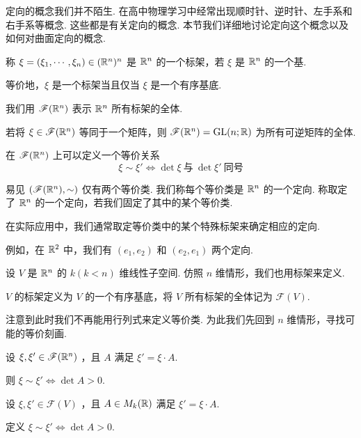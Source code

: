 定向的概念我们并不陌生. 在高中物理学习中经常出现顺时针、逆时针、左手系和右手系等概念. 这些都是有关定向的概念. 本节我们详细地讨论定向这个概念以及如何对曲面定向的概念.


\begin{definition}
称 $\xi=(\xi_1,\cdots,\xi_n)\in(\mathbb{R}^n)^n$ 是 $\mathbb{R}^n$ 的一个标架，若 $\xi$ 是 $\mathbb{R}^n$ 的一个基.
\end{definition}

等价地，$\xi$ 是一个标架当且仅当 $\xi$ 是一个有序基底.

我们用 $\mathscr{F}(\mathbb{R}^n)$ 表示 $\mathbb{R}^n$ 所有标架的全体.

\begin{hint}
若将 $\xi\in\mathscr{F}(\mathbb{R}^n)$ 等同于一个矩阵，则 $\mathscr{F}(\mathbb{R}^n)=\mathrm{GL}(n;\mathbb{R})$ 为所有可逆矩阵的全体.
\end{hint}

在 $\mathscr{F}(\mathbb{R}^n)$ 上可以定义一个等价关系
$$
\xi\sim\xi'\iff\det\xi~\text{与}~\det\xi'~\text{同号}
$$

易见 $(\mathscr{F}(\mathbb{R}^n),\sim)$ 仅有两个等价类. 我们称每个等价类是 $\mathbb{R}^n$ 的一个定向. 称取定了 $\mathbb{R}^n$ 的一个定向，若我们固定了其中的某个等价类.

\begin{hint}
在实际应用中，我们通常取定等价类中的某个特殊标架来确定相应的定向.

例如，在 $\mathbb{R}^2$ 中，我们有 $(e_1,e_2)$ 和 $(e_2,e_1)$ 两个定向.
\end{hint}

设 $V$ 是 $\mathbb{R}^n$ 的 $k(k<n)$ 维线性子空间. 仿照 $n$ 维情形，我们也用标架来定义.

\begin{definition}
$V$ 的标架定义为 $V$ 的一个有序基底，将 $V$ 所有标架的全体记为 $\mathscr{F}(V)$.
\end{definition}

注意到此时我们不再能用行列式来定义等价类. 为此我们先回到 $n$ 维情形，寻找可能的等价刻画.

\begin{property}
设 $\xi,\xi'\in\mathscr{F}(\mathbb{R}^n)$ ，且 $A$ 满足 $\xi'=\xi\cdot A$.

则 $\xi\sim\xi'\iff\det A>0$.
\end{property}

\begin{definition}
设 $\xi,\xi'\in\mathscr{F}(V)$ ，且 $A\in M_k(\mathbb{R})$ 满足 $\xi'=\xi\cdot A$.

定义 $\xi\sim\xi'\iff\det A>0$.
\end{definition}


